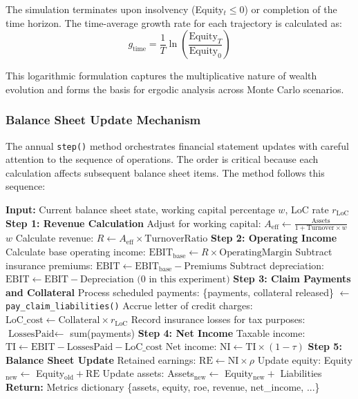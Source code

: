 \documentclass[11pt,letterpaper]{article}
\begin{document}
The simulation terminates upon insolvency (Equity$_t \leq 0$) or completion of the time horizon. The time-average growth rate for each trajectory is calculated as:
\begin{equation}
g_{\text{time}} = \frac{1}{T} \ln\left(\frac{\text{Equity}_T}{\text{Equity}_0}\right)
\end{equation}

This logarithmic formulation captures the multiplicative nature of wealth evolution and forms the basis for ergodic analysis across Monte Carlo scenarios.

\subsubsection{Balance Sheet Update Mechanism}

The annual \texttt{step()} method orchestrates financial statement updates with careful attention to the sequence of operations. The order is critical because each calculation affects subsequent balance sheet items. The method follows this sequence:

\begin{algorithmic}[1]
\State \textbf{Input:} Current balance sheet state, working capital percentage $w$, LoC rate $r_{\text{LoC}}$
\State \textbf{Step 1: Revenue Calculation}
\State Adjust for working capital: $A_{\text{eff}} \gets \frac{\text{Assets}}{1 + \text{Turnover} \times w}$ \text{ (}$w$ 
\State Calculate revenue: $R \gets A_{\text{eff}} \times \text{TurnoverRatio}$
\State \textbf{Step 2: Operating Income}
\State Calculate base operating income: $\text{EBIT}_{\text{base}} \gets R \times \text{OperatingMargin}$
\State Subtract insurance premiums: $\text{EBIT} \gets \text{EBIT}_{\text{base}} - \text{Premiums}$
\State Subtract depreciation: $\text{EBIT} \gets \text{EBIT} - \text{Depreciation (0 in this experiment)}$
\State \textbf{Step 3: Claim Payments and Collateral}
\State Process scheduled payments: \{payments, collateral released\} $\gets$ \texttt{pay\_claim\_liabilities()}
\State Accrue letter of credit charges: $\text{LoC\_cost} \gets \text{Collateral} \times r_{\text{LoC}}$
\State Record insurance losses for tax purposes: $\text{LossesPaid} \gets$ sum(payments)
\State \textbf{Step 4: Net Income}
\State Taxable income: $\text{TI} \gets \text{EBIT} - \text{LossesPaid} - \text{LoC\_cost}$
\State Net income: $\text{NI} \gets \text{TI} \times (1 - \tau)$
\State \textbf{Step 5: Balance Sheet Update}
\State Retained earnings: $\text{RE} \gets \text{NI} \times \rho$
\State Update equity: Equity$_{\text{new}} \gets$ Equity$_{\text{old}} + \text{RE}$
\State Update assets: Assets$_{\text{new}} \gets$ Equity$_{\text{new}} + $ Liabilities
\State \textbf{Return:} Metrics dictionary \{assets, equity, roe, revenue, net\_income, ...\}
\end{algorithmic}
\end{document}
